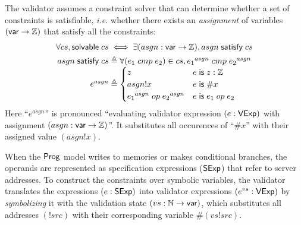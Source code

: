 The validator assumes a constraint solver that can determine whether a set of
constraints is satisfiable, {\it i.e.} whether there exists an {\em assignment}
of variables $(\mathsf{var}\to\mathbb Z)$ that satisfy all the constraints:
\begin{gather*}
  \forall cs,\solvable cs\iff\exists (asgn:\Var\to\Int),\satisfy{asgn}cs\\
  \begin{array}{r@{\;}l}
    \satisfy{asgn}cs\triangleq&\forall(e_1\ccmp e_2)\in cs, {e_1}^{asgn}\ccmp{e_2}^{asgn}\\
    e^{asgn}\triangleq&\begin{cases}
      z&e\Is z:\Int\\
      asgn!x&e\Is \#x\\
      {e_1}^{asgn}\oop{e_2}^{asgn}&e\Is e_1\oop e_2
    \end{cases}
  \end{array}
\end{gather*}
Here ``$e^{asgn}$'' is pronounced ``evaluating validator expression $(e:\mathsf{VExp})$
with assignment $(asgn:\mathsf{var}\to\mathbb Z)$''.  It substitutes all occurences of
``$\#x$'' with their assigned value $(asgn!x)$.

When the $\mathsf{Prog}$ model writes to memories or makes conditional branches, the
operands are represented as specification expressions ($\mathsf{SExp}$) that refer to
server addresses.  To construct the constraints over symbolic variables, the
validator translates the expressions $(e:\mathsf{SExp})$ into validator expressions
$(e^{vs}:\mathsf{VExp})$ by {\em symbolizing} it with the validation state
$(vs:\mathbb N\to\mathsf{var})$, which substitutes all addresses $(!src)$ with their
corresponding variable $\#(vs!src)$.

